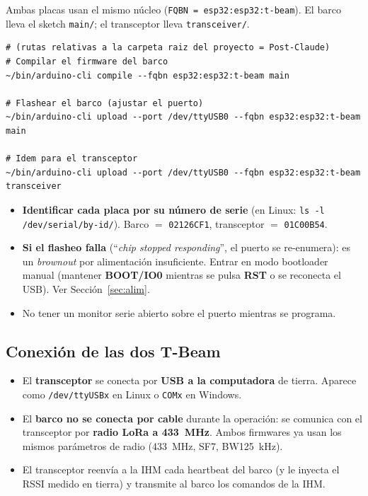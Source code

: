 \documentclass[12pt,a4paper]{article}
\newcommand{\file}[1]{\texttt{#1}}
\begin{document}
Ambas placas usan el mismo n\'ucleo (\texttt{FQBN = esp32:esp32:t-beam}). El barco
lleva el sketch \file{main/}; el transceptor lleva \file{transceiver/}.

\begin{lstlisting}[style=shell, caption={Compilar y flashear con arduino-cli}]
# (rutas relativas a la carpeta raiz del proyecto = Post-Claude)
# Compilar el firmware del barco
~/bin/arduino-cli compile --fqbn esp32:esp32:t-beam main

# Flashear el barco (ajustar el puerto)
~/bin/arduino-cli upload --port /dev/ttyUSB0 --fqbn esp32:esp32:t-beam main

# Idem para el transceptor
~/bin/arduino-cli upload --port /dev/ttyUSB0 --fqbn esp32:esp32:t-beam transceiver
\end{lstlisting}

\begin{itemize}
  \item \textbf{Identificar cada placa por su n\'umero de serie} (en Linux:
    \texttt{ls -l /dev/serial/by-id/}). Barco $=$ \texttt{02126CF1},
    transceptor $=$ \texttt{01C00B54}.
  \item \textbf{Si el flasheo falla} (``\emph{chip stopped responding}'', el puerto
    se re-enumera): es un \emph{brownout} por alimentaci\'on insuficiente.  Entrar en modo bootloader manual (mantener \textbf{BOOT/IO0}
    mientras se pulsa \textbf{RST} o se reconecta el USB). Ver Secci\'on~\ref{sec:alim}.
  \item No tener un monitor serie abierto sobre el puerto mientras se programa.
\end{itemize}

\subsection{Conexi\'on de las dos T-Beam}

\begin{itemize}
  \item El \textbf{transceptor} se conecta por \textbf{USB a la computadora} de
    tierra. Aparece como \texttt{/dev/ttyUSBx} en Linux o \texttt{COMx} en Windows.
  \item El \textbf{barco no se conecta por cable} durante la operaci\'on: se comunica
    con el transceptor por \textbf{radio LoRa a 433~MHz}. Ambos firmwares ya usan los
    mismos par\'ametros de radio (433~MHz, SF7, BW125~kHz).
  \item El transceptor reenv\'ia a la IHM cada heartbeat del barco (y le inyecta el
    RSSI medido en tierra) y transmite al barco los comandos de la IHM.
\end{itemize}
\end{document}
